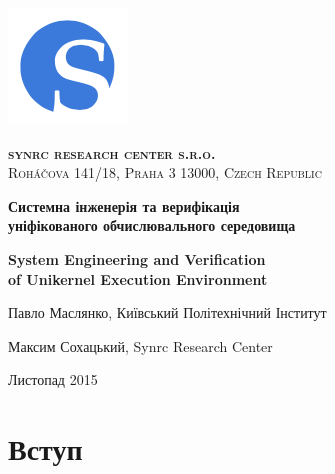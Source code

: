 \documentclass[11pt,oneside]{article}
\begin{document}
\thispagestyle{empty}
\begin{center}

\begin{minipage}[t]{2cm}
    \includegraphics[scale=0.4]{img/S}
\end{minipage}
\begin{minipage}[t]{12cm}
    \begin{flushright}
        \textsc{{\Large {\bf {\color{Blue}syn}{\color{OrangeRed}rc} research center s.r.o.}}}\\
        \textsc{Roháčova 141/18, Praha 3 13000, Czech Republic}\\
    \end{flushright}
\end{minipage}

\vspace{3cm}

    \vspace{3cm}   {\Large \bf Системна інженерія та верифікація\\ \vspace{0.2cm} уніфікованого обчислювального середовища}\par
    \vspace{1cm}   {\Large \bf System Engineering and Verification\\ \vspace{0.2cm} of Unikernel Execution Environment}\par
    \vspace{3cm}   {\Large Павло Маслянко, Київський Політехнічний Інститут\par}
    \vspace{0.3cm} {\Large Максим Сохацький, Synrc Research Center\par}
    \vspace{4cm}   {\Large Листопад 2015}

\end{center}

\newpage
\vspace{2cm}
\tableofcontents
\newpage
\section{Вступ}
\end{document}
